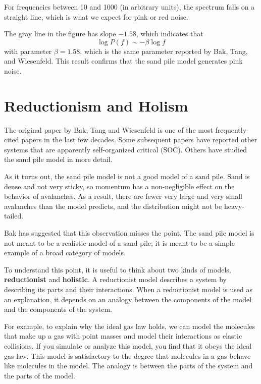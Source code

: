 \documentclass[12pt]{book}
\theoremstyle{exercise}
\begin{document}
For frequencies between
10 and 1000 (in arbitrary units), the spectrum falls on a straight
line, which is what we expect for pink or red noise.

The gray line in the figure has slope $-1.58$, which indicates that
%
\[ \log P(f) \sim -\beta \log f \]
%
with parameter $\beta=1.58$, which is the same parameter reported by Bak,
Tang, and Wiesenfeld.  This result confirms that the sand pile model generates pink noise.


\section{Reductionism and Holism}
\label{model2}

The original paper by Bak, Tang and Wiesenfeld is one of
the most frequently-cited papers in the last few decades.
Some subsequent papers have reported other systems that are apparently
self-organized critical (SOC).  Others have studied the sand pile model in
more detail.


As it turns out, the sand pile model is not a good model of a
sand pile.  Sand is dense and not very sticky, so momentum has a
non-negligible effect on the behavior of avalanches.  As a result,
there are fewer very large and very small avalanches than the model
predicts, and the distribution might not be heavy-tailed.

Bak has suggested that this observation misses the point.
The sand pile model is not meant to be a realistic model of a sand
pile; it is meant to be a simple example of a broad category of
models.

To understand this point, it is useful to think about two
kinds of models, {\bf reductionist} and {\bf holistic}.  A
reductionist model describes a system by describing its parts
and their interactions.  When a reductionist model is used
as an explanation, it depends on an analogy between the
components of the model and the components of the system.


For example, to explain why the ideal gas law holds, we can model the
molecules that make up a gas with point masses and model their
interactions as elastic collisions.  If you simulate or analyze this
model, you find that it obeys the ideal gas law.  This model is
satisfactory to the degree that molecules in a gas behave like
molecules in the model.  The analogy is between the parts of the
system and the parts of the model.
\end{document}
